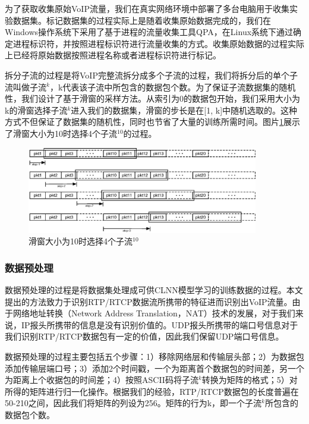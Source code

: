为了获取收集原始VoIP流量，我们在真实网络环境中部署了多台电脑用于收集实验数据集。标记数据集的过程实际上是随着收集原始数据完成的，我们在Windows操作系统下采用了基于进程的流量收集工具QPA，在Linux系统下通过确定进程标识符，并按照进程标识符进行流量收集的方式。收集原始数据的过程实际上已经将原始数据按照进程名称或者进程标识符进行标记。

拆分子流的过程是将VoIP完整流拆分成多个子流的过程，我们将拆分后的单个子流叫做子流$^k$，k代表该子流中所包含的数据包个数。为了保证子流数据集的随机性，我们设计了基于滑窗的采样方法。从索引为0的数据包开始，我们采用大小为k的滑窗选择子流$^k$进入我们的数据集，滑窗的步长是在[1, k]中随机选取的。这种方式不但保证了数据集的随机性，同时也节省了大量的训练所需时间。图片\ref{fig:dataset}展示了滑窗大小为10时选择4个子流$^{10}$的过程。
\begin{figure}[thb]
\begin{center}
\includegraphics[width=0.9\textwidth]{figures/dataset.eps}
\caption{滑窗大小为10时选择4个子流$^{10}$}\label{fig:dataset}
\end{center}
\end{figure}

\subsubsection{数据预处理}
数据预处理的过程是将数据集处理成可供CLNN模型学习的训练数据的过程。本文提出的方法致力于识别RTP/RTCP数据流所携带的特征进而识别出VoIP流量。由于网络地址转换（Network Address Translation，NAT）技术的发展，对于我们来说，IP报头所携带的信息是没有识别价值的。UDP报头所携带的端口号信息对于我们识别RTP/RTCP数据包有一定的价值，因此我们保留UDP端口号信息。

数据预处理的过程主要包括五个步骤：1）移除网络层和传输层头部；2）为数据包添加传输层端口号；3）添加2个时间戳，一个为距离首个数据包的时间差，另一个为距离上个收据包的时间差；4）按照ASCII码将子流$^k$转换为矩阵的格式；5）对所得的矩阵进行归一化操作。根据我们的经验，RTP/RTCP数据包的长度普遍在50-210之间，因此我们将矩阵的列设为256。矩阵的行为k，即一个子流$^k$所包含的数据包个数。

